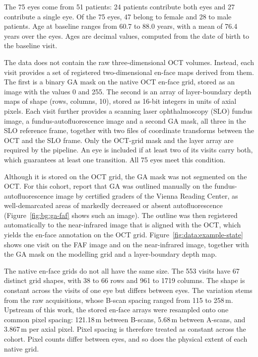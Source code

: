 The 75 eyes come from 51 patients: 24 patients contribute both eyes and
27 contribute a single eye. Of the 75 eyes, 47 belong to female and 28 to
male patients. Age at baseline ranges from 60.7 to 88.0 years, with a
mean of 76.4 years over the eyes. Ages are decimal values, computed from
the date of birth to the baseline visit.

The data does not contain the raw three-dimensional OCT volumes.
Instead, each visit provides a set of registered two-dimensional en-face
maps derived from them. The first is a binary GA mask on the native OCT en-face
grid, stored as an image with the values 0 and 255. The second is an
array of layer-boundary depth maps of shape (rows, columns, 10), stored
as 16-bit integers in units of axial pixels. Each visit further provides
a scanning laser ophthalmoscopy (SLO) fundus image, a
fundus-autofluorescence image and a second GA mask, all three in the SLO
reference frame, together with two files of coordinate transforms between
the OCT and the SLO frame. Only the OCT-grid mask and the layer array are
required by the pipeline. An eye
is included if at least two of its visits carry both, which guarantees
at least one transition. All 75 eyes meet this condition.

Although it is stored on the OCT grid, the GA mask was not segmented on
the OCT.
For this cohort, \citet{Mai2024} report that GA was
outlined manually on the fundus-autofluorescence image by certified
graders of the Vienna Reading Center, as well-demarcated areas of
markedly decreased or absent autofluorescence
(Figure~\ref{fig:bg:ga-faf} shows such an image). The outline was then
registered automatically to the near-infrared image that is aligned with
the OCT, which yields the en-face annotation on the OCT grid.
Figure~\ref{fig:data:example-state} shows one visit on the FAF image and on
the near-infrared image, together with the GA mask on the modelling
grid and a layer-boundary depth map.

The native en-face grids do not all have the same size. The 553 visits have 67
distinct grid shapes, with 38 to 66 rows and 961 to 1719 columns. The
shape is constant across the visits of one eye but differs between eyes.
The variation stems from the raw acquisitions, whose B-scan spacing
ranged from 115 to 258\,\textmu{}m. Upstream of this work, the stored
en-face arrays were resampled onto one common pixel spacing:
121.18\,\textmu{}m between B-scans, 5.68\,\textmu{}m between A-scans, and
3.867\,\textmu{}m per axial pixel. Pixel spacing is therefore treated as
constant across the cohort. Pixel counts differ between eyes, and so does
the physical extent of each native grid.

